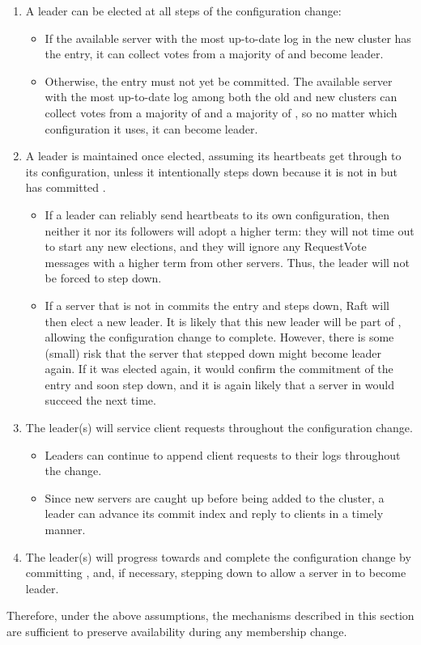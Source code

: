 \begin{enumerate}
%
\item A leader can be elected at all steps of the configuration change:
%
\begin{itemize}
%
\item If the available server with the most up-to-date log in the new
cluster has the \cnew{} entry, it can collect votes from a majority of
\cnew{} and become leader.
%
\item Otherwise, the \cnew{} entry must not yet be committed. The
available server with the most up-to-date log among both the old and new
clusters can collect votes from a majority of \cold{}
and a majority of \cnew{},
so no matter which configuration it uses, it can become leader.
%
\end{itemize}
%
\item A leader is maintained once elected, assuming its heartbeats get
through to its configuration, unless it intentionally steps down because
it is not in \cnew{} but has committed \cnew{}. 
%
\begin{itemize}
%
\item If a leader can reliably send heartbeats to its own configuration,
then neither it nor its followers will adopt a higher term: they will not time
out to start any new elections, and they will ignore any RequestVote
messages with a higher term from other servers. Thus, the leader will
not be forced to step down.
%
\item If a server that is not in \cnew{} commits the \cnew{} entry and
steps down, Raft will then elect a new leader. It is likely that this
new leader will be part of \cnew{}, allowing the configuration change to
complete. However, there is some (small) risk that the server that
stepped down might become leader again. If it was elected again, it
would confirm the commitment of the \cnew{} entry and soon step down,
and it is again likely that a server in \cnew{} would succeed the next
time.
%
\end{itemize}
%
\item The leader(s) will service client requests throughout the
configuration change.
%
\begin{itemize}
%
\item Leaders can continue to append client requests to their logs
throughout the change.
%
\item Since new servers are caught up before being added to the cluster,
a leader can advance its commit index and reply to
clients in a timely manner.
%
\end{itemize}
%
\item The leader(s) will progress towards and complete the configuration
change by committing \cnew{}, and, if necessary, stepping down to allow
a server in \cnew{} to become leader.
%
\end{enumerate}

\noindent
Therefore, under the above assumptions, the mechanisms described in this
section are sufficient to preserve availability during any membership
change.

